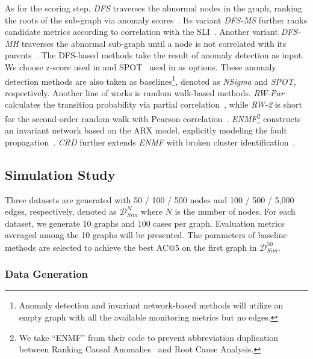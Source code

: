As for the scoring step, \textit{DFS} traverses the abnormal nodes in the graph, ranking the roots of the sub-graph via anomaly scores~\cite{Chen:2014}.
Its variant \textit{DFS-MS} further ranks candidate metrics according to correlation with the SLI~\cite{Lin:2018}.
Another variant \textit{DFS-MH} traverses the abnormal sub-graph until a node is not correlated with its parents~\cite{Liu:2021}.
The DFS-based methods take the result of anomaly detection as input.
We choose z-score used in \cite{Lin:2018} and SPOT~\cite{Siffer:2017} used in \cite{Meng:2020} as options.
These anomaly detection methods are also taken as baselines\footnote{Anomaly detection and invariant network-based methods will utilize an empty graph with all the available monitoring metrics but no edges.}, denoted as \textit{NSigma} and \textit{SPOT}, respectively.
Another line of works is random walk-based methods.
\textit{RW-Par} calculates the transition probability via partial correlation~\cite{Meng:2020}, while \textit{RW-2} is short for the second-order random walk with Pearson correlation~\cite{Wang:2018}.
\textit{ENMF}\footnote{We take ``ENMF'' from their code to prevent abbreviation duplication between Ranking Causal Anomalies~\cite{Cheng:2016} and Root Cause Analysis.} constructs an invariant network based on the ARX model, explicitly modeling the fault propagation~\cite{Cheng:2016}.
\textit{CRD} further extends \textit{ENMF} with broken cluster identification~\cite{Ni:2017}.

\subsection{Simulation Study}

Three datasets are generated with 50 / 100 / 500 nodes and 100 / 500 / 5,000 edges, respectively, denoted as $\mathcal{D}_{Sim}^{N}$ where $N$ is the number of nodes.
For each dataset, we generate 10 graphs and 100 cases per graph.
Evaluation metrics averaged among the 10 graphs will be presented.
The parameters of baseline methods are selected to achieve the best AC@5 on the first graph in $\mathcal{D}_{Sim}^{50}$.

\subsubsection{Data Generation}

